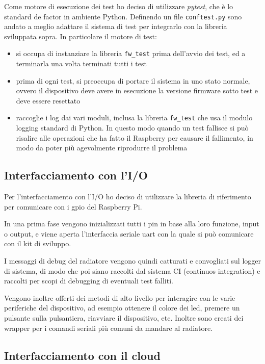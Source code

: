 \documentclass[12pt,a4paper,twoside,titlepage]{book}
\begin{document}
Come motore di esecuzione dei test ho deciso di utilizzare \textit{pytest}, che
è lo standard de factor in ambiente Python. Definendo un file \texttt{conftest.py}
sono andato a meglio adattare il sistema di test per integrarlo con la libreria
sviluppata sopra. In particolare il motore di test:

\begin{itemize}
    \item si occupa di instanziare la libreria \texttt{fw\_test} prima dell'avvio
        dei test, ed a terminarla una volta terminati tutti i test
    \item prima di ogni test, si preoccupa di portare il sistema in uno stato normale,
        ovvero il dispositivo deve avere in esecuzione la versione \gls{firmware} sotto test
        e deve essere resettato
    \item raccoglie i log dai vari moduli, inclusa la libreria \texttt{fw\_test} che
        usa il modulo logging standard di Python. In questo modo quando un test
        fallisce si può risalire alle operazioni che ha fatto il Raspberry per causare
        il fallimento, in modo da poter più agevolmente riprodurre il problema
\end{itemize}

\subsection{Interfacciamento con l'I/O}

Per l'interfacciamento con l'I/O ho deciso di utilizzare la libreria di riferimento
per comunicare con i \Gls{gpio} del Raspberry Pi.

In una prima fase vengono inizializzati tutti i pin in base alla loro funzione, input
o output, e viene aperta l'interfaccia seriale \Gls{uart} con la quale si può comunicare con
il kit di sviluppo.

I messaggi di debug del radiatore vengono quindi catturati e convogliati sul logger
di sistema, di modo che poi siano raccolti dal sistema CI (continuos integration)
e raccolti per scopi di debugging di eventuali test falliti.

Vengono inoltre offerti dei metodi di alto livello per interagire con le varie
periferiche del dispositivo, ad esempio ottenere il colore dei led, premere un
pulsante sulla pulsantiera, riavviare il dispositivo, etc.
Inoltre sono creati dei wrapper per i comandi seriali più comuni da mandare al
radiatore.

\subsection{Interfacciamento con il cloud}
\end{document}
